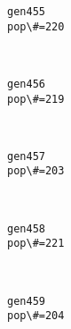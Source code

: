 \documentclass[11pt]{article}
\begin{document}
    \begin{Verbatim}[commandchars=\\\{\}]
gen455
pop\#=220

    \end{Verbatim}

    \begin{center}
    \end{center}
    { \hspace*{\fill} \\}
    
    \begin{Verbatim}[commandchars=\\\{\}]
gen456
pop\#=219

    \end{Verbatim}

    \begin{center}
    \end{center}
    { \hspace*{\fill} \\}
    
    \begin{Verbatim}[commandchars=\\\{\}]
gen457
pop\#=203

    \end{Verbatim}

    \begin{center}
    \end{center}
    { \hspace*{\fill} \\}
    
    \begin{Verbatim}[commandchars=\\\{\}]
gen458
pop\#=221

    \end{Verbatim}

    \begin{center}
    \end{center}
    { \hspace*{\fill} \\}
    
    \begin{Verbatim}[commandchars=\\\{\}]
gen459
pop\#=204

    \end{Verbatim}
\end{document}
